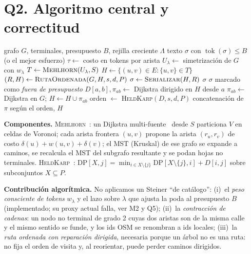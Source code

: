 \documentclass[conference,10pt]{IEEEtran}
\newcommand{\tok}{\operatorname{tok}}
\newcommand{\Sterm}{S}
\begin{document}
\section{Q2. Algoritmo central y correctitud}
\begin{algorithm}[t]
\caption{\textsc{TokenSteinerRoute}$(G,s,d,P,B,\Lambda)$}\label{alg:main}
\begin{algorithmic}[1]
\Require grafo $G$, terminales, presupuesto $B$, rejilla creciente $\Lambda$
\Ensure texto $\sigma$ con $\tok(\sigma)\le B$ (o el mejor esfuerzo)
\State $\tau \gets$ costo en tokens por arista 
  \State $U_\lambda \gets$ simetrización de $G$ con $w_\lambda$
  \State $T \gets \textsc{Mehlhorn}(U_\lambda,\Sterm)$ 
  \State $H \gets \{(u,v)\in E : \{u,v\}\in T\}$ 
  \State $(R,H) \gets \textsc{RutaOrdenada}(G,H,s,d,P)$
  \State $\sigma \gets \textsc{Serializar}(H,R)$ 
  \If{$\tok(\sigma)\le B$} \Return $\sigma$ \EndIf
\EndFor
\State \Return $\sigma$ marcado como \emph{fuera de presupuesto}
\Statex
{}
  \For{$a\in\Sterm$; $b\in\Sterm\setminus\{a\}$}
    \State $D[a,b],\pi_{ab}\gets$ Dijkstra dirigido en $H$ desde $a$
     
      \State $\pi_{ab}\gets$ Dijkstra en $G$; $H\gets H\cup\pi_{ab}$ 
    \EndIf
  \EndFor
  \State orden $\gets$ \textsc{HeldKarp}$(D,s,d,P)$
  \State \Return concatenación de $\pi$ según el orden, $H$
\EndProcedure
\end{algorithmic}
\end{algorithm}

\textbf{Componentes.} \textsc{Mehlhorn}~\cite{mehlhorn1988}: un Dijkstra multi-fuente~\cite{dijkstra1959} desde $\Sterm$ particiona $V$ en celdas de Voronoi; cada arista frontera $(u,v)$ propone la arista $(r_u,r_v)$ de costo $\delta(u)+w(u,v)+\delta(v)$; el MST (Kruskal) de ese grafo se expande a caminos, se recalcula el MST del subgrafo resultante y se podan hojas no terminales. \textsc{HeldKarp}~\cite{heldkarp1962}: $\mathrm{DP}[X,j]=\min_{i\in X\setminus\{j\}}\mathrm{DP}[X\setminus\{j\},i]+D[i,j]$ sobre subconjuntos $X\subseteq P$.

\textbf{Contribución algorítmica.} No aplicamos un Steiner ``de catálogo'': (i)~el \emph{peso consciente de tokens} $w_\lambda$ y el lazo sobre $\lambda$ que ajusta la poda al presupuesto $B$ (implementado; su proxy actual falla, ver M2 y Q5); (ii)~la \emph{contracción de cadenas}: un nodo no terminal de grado 2 cuyas dos aristas son de la misma calle y el mismo sentido se funde, y los ids OSM se renombran a ids locales; (iii)~la \emph{ruta ordenada con reparación dirigida}, necesaria porque un árbol no es una ruta: no fija el orden de visita y, al reorientar, puede perder caminos dirigidos.
\end{document}

